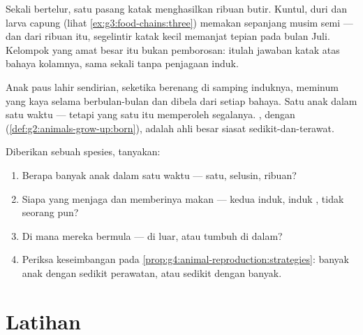 \begin{example}\label{ex:g4:animal-reproduction:pondcount}
Sekali bertelur, satu pasang katak menghasilkan ribuan butir. Kuntul,
 duri dan larva capung (lihat \cref{ex:g3:food-chains:three})
memakan  sepanjang musim semi --- dan dari ribuan itu, segelintir
katak kecil memanjat tepian pada bulan Juli. Kelompok  yang amat
besar itu bukan pemborosan: itulah jawaban katak atas bahaya kolamnya,
sama sekali tanpa penjagaan induk.
\end{example}

\begin{example}\label{ex:g4:animal-reproduction:whalecalf}
Anak paus lahir sendirian, seketika berenang di samping induknya,
meminum  yang kaya selama berbulan-bulan dan dibela dari setiap
bahaya. Satu anak dalam satu waktu --- tetapi yang satu itu memperoleh
segalanya. , dengan 
(\cref{def:g2:animals-grow-up:born}), adalah ahli besar siasat
sedikit-dan-terawat.
\end{example}

\begin{method}\label{met:g4:animal-reproduction:read}
Diberikan sebuah spesies, tanyakan:
\begin{enumerate}
  \item Berapa banyak anak dalam satu waktu --- satu, selusin, ribuan?
  \item Siapa yang menjaga dan memberinya makan --- kedua induk,
        induk , tidak seorang pun?
  \item Di mana mereka bermula ---  di luar, atau tumbuh di
        dalam?
  \item Periksa keseimbangan pada
        \cref{prop:g4:animal-reproduction:strategies}: banyak anak
        dengan sedikit perawatan, atau sedikit dengan banyak.
\end{enumerate}
\end{method}

\section{Latihan}


